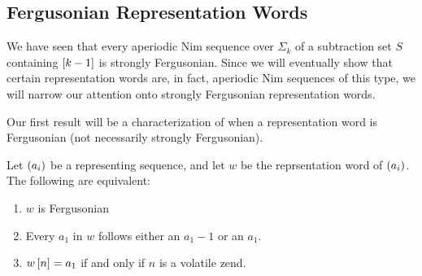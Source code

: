 \documentclass[english,12pt]{article}
\newcommand{\seq}{\p}
\begin{document}
\subsection{Fergusonian Representation Words}
We have seen that every aperiodic Nim sequence over $\Sigma_k$ of a subtraction set $S$ containing $\left[k-1\right]$ is strongly Fergusonian.  Since we will eventually show that certain representation words are, in fact, aperiodic Nim sequences of this type, we will narrow our attention onto strongly Fergusonian representation words.

Our first result will be a characterization of when a representation word is Fergusonian (not necessarily strongly Fergusonian).
\begin{prop}\label{prop:traceferg}
Let $\seq{a_i}$ be a representing sequence, and let $w$ be the reprsentation word of $\seq{a_i}$.  The following are equivalent:
\begin{enumerate}
\item\label{it:ferg1} $w$ is Fergusonian
\item\label{it:ferg2} Every $a_1$ in $w$ follows either an $a_1-1$ or an $a_1$.
\item\label{it:ferg3} $w\left[n\right]=a_1$ if and only if $n$ is a volatile zend.
\end{enumerate}
\end{prop}
\end{document}
